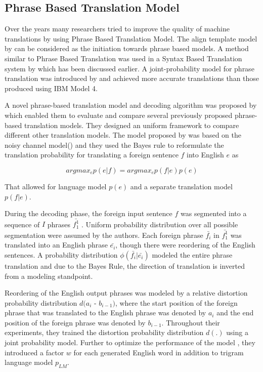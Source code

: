 \subsection{Phrase Based Translation Model}
Over the years many researchers tried to improve the quality of machine translations by using Phrase Based Translation Model. The align template model by \cite{W99-0604} can be considered as the initiation towards phrase based models. A method similar to Phrase Based Translation was used in a Syntax Based Translation system by \cite{Yamada:2001:SST:1073012.1073079} which has been discussed earlier. A joint-probability model for phrase translation was introduced by \cite{Marcu:2002:PJP:1118693.1118711} and achieved more accurate translations than those produced using IBM Model 4.

A novel phrase-based translation model and decoding algorithm was proposed by \cite{Koehn:2003:SPT:1073445.1073462} which enabled them to evaluate and compare several previously proposed phrase-based translation models. They designed an uniform framework to compare different other translation models. The model proposed by \cite{Koehn:2003:SPT:1073445.1073462} was based on the noisy channel model(\cite{Brown:1993:MSM:972470.972474}) and they used the Bayes rule to reformulate the translation probability for translating a foreign sentence $f$ into English $e$ as

$$
argmax_ep(e|f)= argmax_ep(f|e)p(e)
$$

That allowed for language model $p(e)$ and a separate translation model $p(f|e)$.

During the decoding phase, the foreign input sentence $f$ was segmented into a sequence of $I$ phrases $\bar{f_1^1}$ . Uniform probability distribution over all possible segmentation were assumed by the authors. Each foreign phrase $\bar{f_i}$ in $\bar{f_1^1}$ was translated into an English phrase $\bar{e_i}$, though there were reordering of the English sentences. A probability distribution $\phi(\bar{f_i}|\bar{e_i})$ modeled the entire phrase translation and due to the Bayes Rule, the direction of translation is inverted from a modeling standpoint. 

Reordering of the English output phrases was modeled by a relative distortion probability distribution $d(a_i$ - $b_{i-1})$, where the start position of the foreign phrase that was translated to the English phrase was denoted by $a_i$ and the end position of the foreign phrase was denoted by $b_{i-1}$. Throughout their experiments, they trained the distortion probability distribution $d (.)$ using a joint probability model. Further to optimize the performance of the model , they introduced a factor $w$ for each generated English word in addition to trigram language model $p_{LM}$. 


